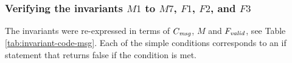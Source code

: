 \documentclass{article}
\begin{document}
\begin{algorithm}[ht]
\begin{algorithmic}[1]
\EndFunction
\end{algorithmic}
\end{algorithm}

\subsubsection{Verifying the invariants \(M1\) to \(M7\), \(F1\), \(F2\), and \(F3\)}
\label{sec:m-invariant-checks}

The invariants were re-expressed in terms of $C_\emph{msg}$, $M$ and $F_\emph{valid}$, see Table \ref{tab:invariant-code-msg}. Each of the simple conditions corresponds to an if statement that returns false if the condition is met.
\end{document}
